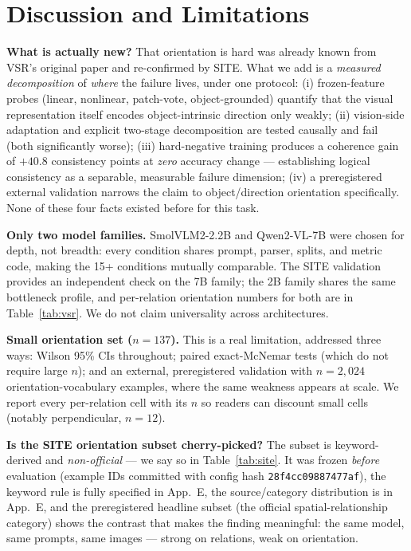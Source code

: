 \section{Discussion and Limitations}
\label{sec:discussion}

\textbf{What is actually new?} That orientation is hard was already known from
VSR's original paper and re-confirmed by SITE. What we add is a
\emph{measured decomposition} of \emph{where} the failure lives, under one
protocol: (i) frozen-feature probes (linear, nonlinear, patch-vote,
object-grounded) quantify that the visual representation itself encodes
object-intrinsic direction only weakly; (ii) vision-side adaptation and explicit
two-stage decomposition are tested causally and fail (both significantly worse);
(iii) hard-negative training produces a coherence gain of $+40.8$ consistency
points at \emph{zero} accuracy change --- establishing logical consistency as a
separable, measurable failure dimension; (iv) a preregistered external validation
narrows the claim to object/direction orientation specifically. None of these
four facts existed before for this task.

\textbf{Only two model families.} SmolVLM2-2.2B and Qwen2-VL-7B were chosen for
depth, not breadth: every condition shares prompt, parser, splits, and metric
code, making the 15+ conditions mutually comparable. The SITE validation
provides an independent check on the 7B family; the 2B family shares the same
bottleneck profile, and per-relation orientation numbers for both are in
Table~\ref{tab:vsr}. We do not claim universality across architectures.

\textbf{Small orientation set ($n{=}137$).} This is a real limitation, addressed
three ways: Wilson 95\% CIs throughout; paired exact-McNemar tests (which do not
require large $n$); and an external, preregistered validation with $n{=}2{,}024$
orientation-vocabulary examples, where the same weakness appears at scale. We
report every per-relation cell with its $n$ so readers can discount small cells
(notably perpendicular, $n{=}12$).

\textbf{Is the SITE orientation subset cherry-picked?} The subset is
keyword-derived and \emph{non-official} --- we say so in Table~\ref{tab:site}.
It was frozen \emph{before} evaluation (example IDs committed with config hash
\texttt{28f4cc09887477af}), the keyword rule is fully specified in
App.~E, the source/category distribution is in
App.~E, and the preregistered headline subset (the official
spatial-relationship category) shows the contrast that makes the finding
meaningful: the same model, same prompts, same images --- strong on relations,
weak on orientation.

